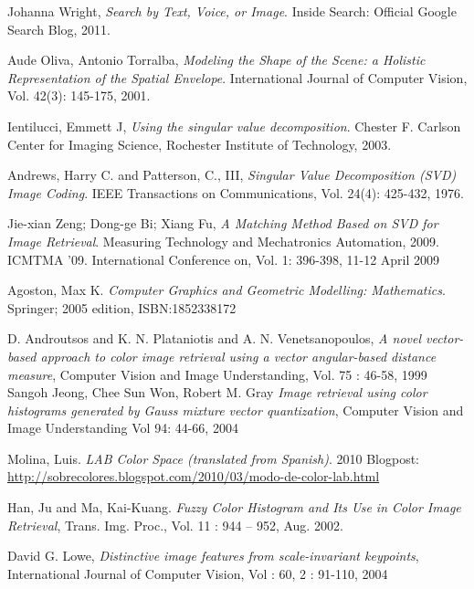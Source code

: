 \documentclass{report}
\begin{document}
\begin{thebibliography}{6}

  Johanna Wright,
  \emph{Search by Text, Voice, or Image}.
  Inside Search: Official Google Search Blog,
  2011.
  
  Aude Oliva, Antonio Torralba,
  \emph{	Modeling the Shape of the Scene: a Holistic Representation of the Spatial Envelope}.
  International Journal of Computer Vision, 
  Vol. 42(3): 145-175, 
  2001.

  Ientilucci, Emmett J,
  \emph{Using the singular value decomposition}. 
  Chester F. Carlson Center for Imaging Science,
  Rochester Institute of Technology,
  2003.

  Andrews, Harry C. and Patterson, C., III,
  \emph{ Singular Value Decomposition (SVD) Image Coding}.
  IEEE Transactions on Communications,
  Vol. 24(4): 425-432,
  1976.

  Jie-xian Zeng; Dong-ge Bi; Xiang Fu,
  \emph{A Matching Method Based on SVD for Image Retrieval}.
  Measuring Technology and Mechatronics Automation, 2009. ICMTMA '09. International Conference on, 
  Vol. 1: 396-398, 
  11-12 April 2009
  
  Agoston, Max K.
  \emph{Computer Graphics and Geometric Modelling: Mathematics}.
  Springer; 2005 edition,
  ISBN:1852338172
  
    D. Androutsos and K. N. Plataniotis and A. N. Venetsanopoulos,
    \emph{A novel vector-based approach to color image retrieval using a vector angular-based distance measure},
    Computer Vision and Image Understanding,
    Vol. 75 : 46-58,
    1999
	Sangoh Jeong, Chee Sun Won, Robert M. Gray
	\emph{Image retrieval using color histograms generated by Gauss mixture vector quantization},
	Computer Vision and Image Understanding 
	Vol 94: 44-66,
	2004
	
   Molina, Luis.
   \emph{LAB Color Space (translated from Spanish)}.
   2010 Blogpost: \url{http://sobrecolores.blogspot.com/2010/03/modo-de-color-lab.html}

   Han, Ju and Ma, Kai-Kuang.
   \emph{Fuzzy Color Histogram and Its Use in Color Image Retrieval},
   Trans. Img. Proc.,
   Vol. 11 : 944 -- 952, 
   Aug. 2002.
   
   David G. Lowe, 
   \emph{Distinctive image features from scale-invariant keypoints},
   International Journal of Computer Vision, 
   Vol : 60, 2 : 91-110,
   2004
   

\end{thebibliography}
\end{document}
